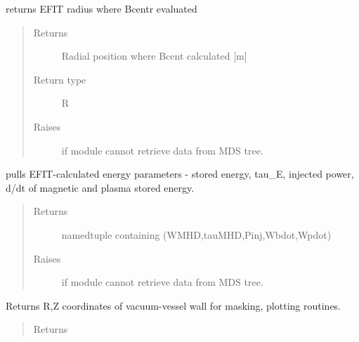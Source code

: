 \documentclass[letterpaper,10pt,english]{sphinxmanual}
\begin{document}
\begin{fulllineitems}
\begin{fulllineitems}
\label{\detokenize{eqtools:eqtools.EFIT.EFITTree.getRCentr}}
returns EFIT radius where Bcentr evaluated
\begin{quote}\begin{description}
\item[{Returns}] \leavevmode
Radial position where Bcent calculated {[}m{]}

\item[{Return type}] \leavevmode
R

\item[{Raises}] \leavevmode
{} \textendash{} if module cannot retrieve data from MDS tree.

\end{description}\end{quote}

\end{fulllineitems}


\begin{fulllineitems}
\label{\detokenize{eqtools:eqtools.EFIT.EFITTree.getEnergy}}
pulls EFIT-calculated energy parameters - stored energy, tau\_E,
injected power, d/dt of magnetic and plasma stored energy.
\begin{quote}\begin{description}
\item[{Returns}] \leavevmode
namedtuple containing (WMHD,tauMHD,Pinj,Wbdot,Wpdot)

\item[{Raises}] \leavevmode
{} \textendash{} if module cannot retrieve data from MDS tree.

\end{description}\end{quote}

\end{fulllineitems}


\begin{fulllineitems}
\label{\detokenize{eqtools:eqtools.EFIT.EFITTree.getMachineCrossSection}}
Returns R,Z coordinates of vacuum-vessel wall for masking, plotting
routines.
\begin{quote}\begin{description}
\item[{Returns}] \leavevmode


\end{description}
\end{quote}
\end{fulllineitems}
\end{fulllineitems}
\end{document}
